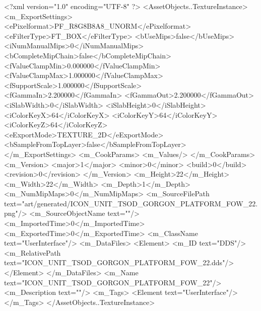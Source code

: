 <?xml version="1.0" encoding="UTF-8" ?>
<AssetObjects..TextureInstance>
	<m_ExportSettings>
		<ePixelformat>PF_R8G8B8A8_UNORM</ePixelformat>
		<eFilterType>FT_BOX</eFilterType>
		<bUseMips>false</bUseMips>
		<iNumManualMips>0</iNumManualMips>
		<bCompleteMipChain>false</bCompleteMipChain>
		<fValueClampMin>0.000000</fValueClampMin>
		<fValueClampMax>1.000000</fValueClampMax>
		<fSupportScale>1.000000</fSupportScale>
		<fGammaIn>2.200000</fGammaIn>
		<fGammaOut>2.200000</fGammaOut>
		<iSlabWidth>0</iSlabWidth>
		<iSlabHeight>0</iSlabHeight>
		<iColorKeyX>64</iColorKeyX>
		<iColorKeyY>64</iColorKeyY>
		<iColorKeyZ>64</iColorKeyZ>
		<eExportMode>TEXTURE_2D</eExportMode>
		<bSampleFromTopLayer>false</bSampleFromTopLayer>
	</m_ExportSettings>
	<m_CookParams>
		<m_Values/>
	</m_CookParams>
	<m_Version>
		<major>1</major>
		<minor>0</minor>
		<build>0</build>
		<revision>0</revision>
	</m_Version>
	<m_Height>22</m_Height>
	<m_Width>22</m_Width>
	<m_Depth>1</m_Depth>
	<m_NumMipMaps>0</m_NumMipMaps>
	<m_SourceFilePath text="art/generated/ICON_UNIT_TSOD_GORGON_PLATFORM_FOW_22.png"/>
	<m_SourceObjectName text=""/>
	<m_ImportedTime>0</m_ImportedTime>
	<m_ExportedTime>0</m_ExportedTime>
	<m_ClassName text="UserInterface"/>
	<m_DataFiles>
		<Element>
			<m_ID text="DDS"/>
			<m_RelativePath text="ICON_UNIT_TSOD_GORGON_PLATFORM_FOW_22.dds"/>
		</Element>
	</m_DataFiles>
	<m_Name text="ICON_UNIT_TSOD_GORGON_PLATFORM_FOW_22"/>
	<m_Description text=""/>
	<m_Tags>
		<Element text="UserInterface"/>
	</m_Tags>
</AssetObjects..TextureInstance>
